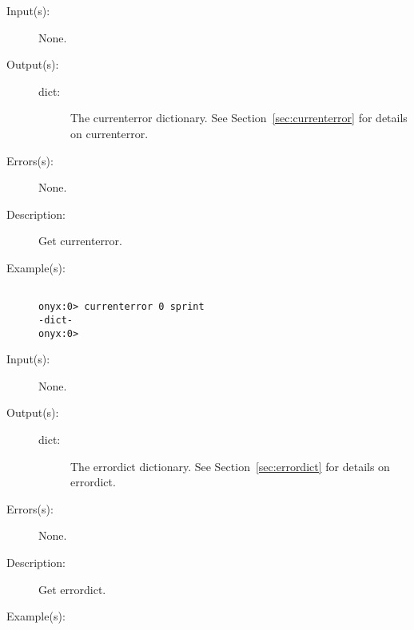 \begin{description}
\label{threaddict:currenterror}
\item[{\onyxop{--}{currenterror}{dict}}: ]
	\begin{description}\item[]
	\item[Input(s): ] None.
	\item[Output(s): ]
		\begin{description}\item[]
		\item[dict: ]
			The currenterror dictionary.  See
			Section~\ref{sec:currenterror} for details on
			currenterror.
		\end{description}
	\item[Errors(s): ] None.
	\item[Description: ]
		Get currenterror.
	\item[Example(s): ]\begin{verbatim}

onyx:0> currenterror 0 sprint
-dict-
onyx:0>
	\end{verbatim}
	\end{description}
\label{threaddict:errordict}
\item[{\onyxop{--}{errordict}{dict}}: ]
	\begin{description}\item[]
	\item[Input(s): ] None.
	\item[Output(s): ]
		\begin{description}\item[]
		\item[dict: ]
			The errordict dictionary.  See
			Section~\ref{sec:errordict} for details on errordict.
		\end{description}
	\item[Errors(s): ] None.
	\item[Description: ]
		Get errordict.
	\item[Example(s): ]\begin{verbatim}


\end{verbatim}
\end{description}
\end{description}
